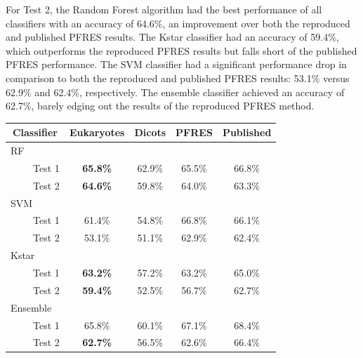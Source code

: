 \documentclass{bioinfo}
\begin{document}
For Test 2, the Random Forest algorithm had the best performance of all classifiers with an accuracy of 64.6\%, an improvement over both the reproduced and published PFRES results.
The Kstar classifier had an accuracy of 59.4\%, which outperforms the reproduced PFRES results but falls short of the published PFRES performance.
The SVM classifier had a significant performance drop in comparison to both the reproduced and published PFRES results: 53.1\% versus 62.9\% and 62.4\%, respectively.
The ensemble classifier achieved an accuracy of 62.7\%, barely edging out the results of the reproduced PFRES method.

\begin{table} \centering
  \begin{tabular}{ c c c c c }
    \hline
    \textbf{Classifier} & \textbf{Eukaryotes} & \textbf{Dicots} & \textbf{PFRES} & \textbf{Published} \\ \hline
    \multicolumn{1}{l}{RF} & \multicolumn{4}{c}{\hspace{15px}} \\
    \multicolumn{1}{r}{Test 1} & \textbf{65.8\%} & 62.9\% & 65.5\% & 66.8\% \\
    \multicolumn{1}{r}{Test 2} & \textbf{64.6\%} & 59.8\% & 64.0\% & 63.3\% \\
    \multicolumn{1}{l}{SVM} & \multicolumn{4}{c}{\hspace{15px}} \\
    \multicolumn{1}{r}{Test 1} & 61.4\% & 54.8\% & 66.8\% & 66.1\% \\
    \multicolumn{1}{r}{Test 2} & 53.1\% & 51.1\% & 62.9\% & 62.4\% \\
    \multicolumn{1}{l}{Kstar} & \multicolumn{4}{c}{\hspace{15px}} \\
    \multicolumn{1}{r}{Test 1} & \textbf{63.2\%} & 57.2\% & 63.2\% & 65.0\% \\
    \multicolumn{1}{r}{Test 2} & \textbf{59.4\%} & 52.5\% & 56.7\% & 62.7\% \\
    \multicolumn{1}{l}{Ensemble \hspace{25px} ~} & \multicolumn{4}{c}{\hspace{15px}} \\
    \multicolumn{1}{r}{Test 1} & 65.8\% & 60.1\% & 67.1\% & 68.4\% \\
    \multicolumn{1}{r}{Test 2} & \textbf{62.7\%} & 56.5\% & 62.6\% & 66.4\% \\ \hline
  \end{tabular}
  \vspace{5px}

\end{table}
\end{document}
